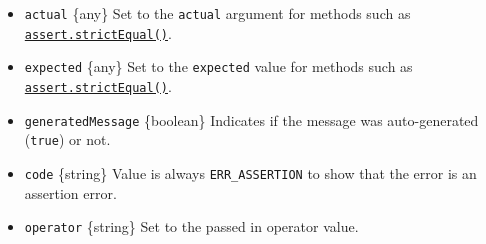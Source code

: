 \begin{itemize}
\tightlist
\item
  \texttt{actual} \{any\} Set to the \texttt{actual} argument for
  methods such as
  \hyperref[assertstrictequalactual-expected-message]{\texttt{assert.strictEqual()}}.
\item
  \texttt{expected} \{any\} Set to the \texttt{expected} value for
  methods such as
  \hyperref[assertstrictequalactual-expected-message]{\texttt{assert.strictEqual()}}.
\item
  \texttt{generatedMessage} \{boolean\} Indicates if the message was
  auto-generated (\texttt{true}) or not.
\item
  \texttt{code} \{string\} Value is always \texttt{ERR\_ASSERTION} to
  show that the error is an assertion error.
\item
  \texttt{operator} \{string\} Set to the passed in operator value.
\end{itemize}

